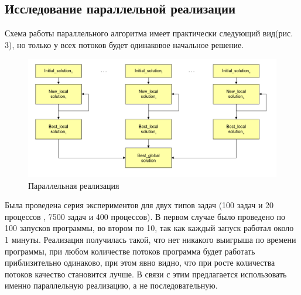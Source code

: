 \documentclass{article}
\begin{document}
\subsection{Исследование параллельной реализации}

Схема работы параллельного алгоритма имеет практически следующий вид(рис. 3), но только у всех потоков будет одинаковое начальное решение.

\begin{figure}[!h]
    \centering
    \includegraphics[width=1\linewidth]{Снимок экрана 2024-11-04 в 13.41.24.png}
    \caption{Параллельная реализация}
    \label{fig:enter-label}
\end{figure}

\newpage

Была проведена серия экспериментов для двух типов задач (100 задач и 20 процессов , 7500 задач и 400 процессов). В первом случае было проведено по 100 запусков программы, во втором по 10, так как каждый запуск работал около 1 минуты. Реализация получилась такой, что нет никакого выигрыша по времени программы, при любом количестве потоков программа будет работать приблизительно одинаково, при этом явно видно, что при росте количества потоков качество становится лучше. В связи с этим предлагается использовать именно параллельную реализацию, а не последовательную.
\end{document}
